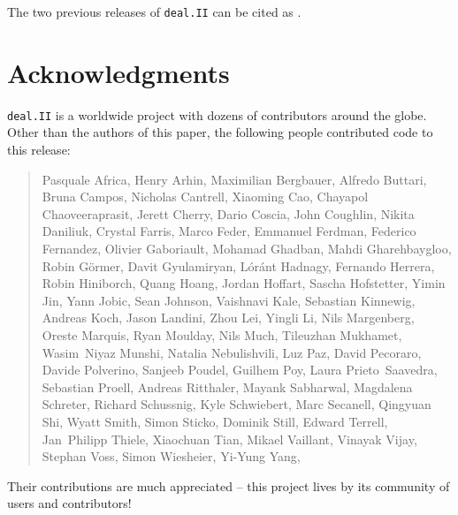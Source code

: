 \documentclass{ansarticle-preprint}
\newcommand{\specialword}[1]{\texttt{#1}}
\newcommand{\dealii}{{\specialword{deal.II}}\xspace}
\begin{document}
The two previous releases of \dealii can be cited as
\cite{dealII95,dealII96}.


\section{Acknowledgments}

\dealii is a worldwide project with dozens of contributors around the
globe. Other than the authors of this paper, the following people
contributed code to this release:\\

\begin{quote}
Pasquale     Africa,
Henry        Arhin,
Maximilian   Bergbauer,
Alfredo      Buttari,
Bruna        Campos,
Nicholas     Cantrell,
Xiaoming     Cao,
Chayapol     Chaoveeraprasit,
Jerett       Cherry,
Dario        Coscia,
John         Coughlin,
Nikita       Daniliuk,
Crystal      Farris,
Marco        Feder,
Emmanuel     Ferdman,
Federico     Fernandez,
Olivier      Gaboriault,
Mohamad      Ghadban,
Mahdi        Gharehbaygloo,
Robin        Görmer,
Davit        Gyulamiryan,
Lóránt       Hadnagy,
Fernando     Herrera,
Robin        Hiniborch,
Quang        Hoang,
Jordan       Hoffart,
Sascha       Hofstetter,
Yimin        Jin,
Yann         Jobic,
Sean         Johnson,
Vaishnavi    Kale,
Sebastian    Kinnewig,
Andreas      Koch,
Jason        Landini,
Zhou         Lei,
Yingli       Li,
Nils         Margenberg,
Oreste       Marquis,
Ryan         Moulday,
Nils         Much,
Tileuzhan    Mukhamet,
Wasim~Niyaz  Munshi,
Natalia      Nebulishvili,
Luz          Paz,
David        Pecoraro,
Davide       Polverino,
Sanjeeb      Poudel,
Guilhem      Poy,
Laura        Prieto~Saavedra,
Sebastian    Proell,
Andreas      Ritthaler,
Mayank       Sabharwal,
Magdalena    Schreter,
Richard      Schussnig,
Kyle         Schwiebert,
Marc         Secanell,
Qingyuan     Shi,
Wyatt        Smith,
Simon        Sticko,
Dominik      Still,
Edward       Terrell,
Jan~Philipp  Thiele,
Xiaochuan    Tian,
Mikael       Vaillant,
Vinayak      Vijay,
Stephan      Voss,
Simon        Wiesheier,
Yi-Yung      Yang,
\end{quote}
Their contributions are much appreciated -- this project lives by its
community of users and contributors!
\end{document}
